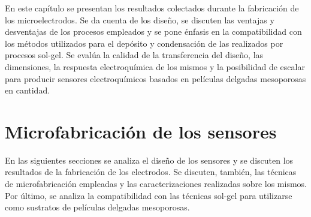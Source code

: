 	En este capítulo se presentan los resultados colectados durante la fabricación de los microelectrodos. Se da cuenta de los diseño, se discuten las ventajas y desventajas de los procesos empleados y se pone énfasis en la compatibilidad con los métodos utilizados para el depósito y condensación de las \pdm\space realizados por procesos sol-gel. Se evalúa la calidad de la transferencia del diseño, las dimensiones, la respuesta electroquímica de los mismos y la posibilidad de escalar para producir sensores electroquímicos basados en películas delgadas mesoporosas en cantidad.



	
\section{Microfabricación de los sensores}
		
	 	 En las siguientes secciones se analiza el diseño de los sensores y se discuten los resultados de la fabricación de los electrodos. Se discuten, también, las técnicas de microfabricación empleadas y las caracterizaciones realizadas sobre los mismos. Por último, se analiza la compatibilidad con las técnicas sol-gel para utilizarse como sustratos de películas delgadas mesoporosas.

